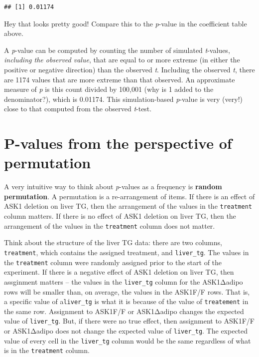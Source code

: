 \documentclass[]{book}
\begin{document}
\begin{verbatim}
## [1] 0.01174
\end{verbatim}

Hey that looks pretty good! Compare this to the \emph{p}-value in the coefficient table above.

A \emph{p}-value can be computed by counting the number of simulated \emph{t}-values, \emph{including the observed value}, that are equal to or more extreme (in either the positive or negative direction) than the observed \emph{t}. Including the observed \emph{t}, there are 1174 values that are more extreme than that observed. An approximate measure of \emph{p} is this count divided by 100,001 (why is 1 added to the denominator?), which is 0.01174. This simulation-based \emph{p}-value is very (very!) close to that computed from the observed \emph{t}-test.

\hypertarget{p-values-from-the-perspective-of-permutation}{%
\section{P-values from the perspective of permutation}\label{p-values-from-the-perspective-of-permutation}}

A very intuitive way to think about \emph{p}-values as a frequency is \textbf{random permutation}. A permutation is a re-arrangement of items. If there is an effect of ASK1 deletion on liver TG, then the arrangement of the values in the \texttt{treatment} column matters. If there is no effect of ASK1 deletion on liver TG, then the arrangement of the values in the \texttt{treatment} column does not matter.

Think about the structure of the liver TG data: there are two columns, \texttt{treatment}, which contains the assigned treatment, and \texttt{liver\_tg}. The values in the \texttt{treatment} column were randomly assigned prior to the start of the experiment. If there is a negative effect of ASK1 deletion on liver TG, then assginment matters -- the values in the \texttt{liver\_tg} column for the ASK1Δadipo rows will be smaller than, on average, the values in the ASK1F/F rows. That is, a specific value of a\texttt{liver\_tg} is what it is because of the value of \texttt{treatement} in the same row. Assignment to ASK1F/F or ASK1Δadipo changes the expected value of \texttt{liver\_tg}. But, if there were no true effect, then assignment to ASK1F/F or ASK1Δadipo does not change the expected value of \texttt{liver\_tg}. The expected value of every cell in the \texttt{liver\_tg} column would be the same regardless of what is in the \texttt{treatment} column.
\end{document}
